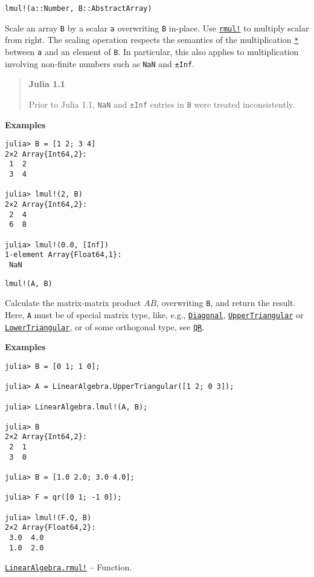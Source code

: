 \begin{adjustwidth}{2em}{0pt}


\begin{verbatim}
lmul!(a::Number, B::AbstractArray)
\end{verbatim}

Scale an array \texttt{B} by a scalar \texttt{a} overwriting \texttt{B} in-place.  Use \hyperlink{11562785155463579477}{\texttt{rmul!}} to multiply scalar from right.  The scaling operation respects the semantics of the multiplication \hyperlink{7592762607639177347}{\texttt{*}} between \texttt{a} and an element of \texttt{B}.  In particular, this also applies to multiplication involving non-finite numbers such as \texttt{NaN} and \texttt{±Inf}.

\begin{quote}
\textbf{Julia 1.1}

Prior to Julia 1.1, \texttt{NaN} and \texttt{±Inf} entries in \texttt{B} were treated inconsistently.

\end{quote}
\textbf{Examples}


\begin{verbatim}
julia> B = [1 2; 3 4]
2×2 Array{Int64,2}:
 1  2
 3  4

julia> lmul!(2, B)
2×2 Array{Int64,2}:
 2  4
 6  8

julia> lmul!(0.0, [Inf])
1-element Array{Float64,1}:
 NaN
\end{verbatim}




\begin{lstlisting}
lmul!(A, B)
\end{lstlisting}

Calculate the matrix-matrix product \(AB\), overwriting \texttt{B}, and return the result. Here, \texttt{A} must be of special matrix type, like, e.g., \hyperlink{3300114559258360989}{\texttt{Diagonal}}, \hyperlink{6344726545165008167}{\texttt{UpperTriangular}} or \hyperlink{15116078732779234709}{\texttt{LowerTriangular}}, or of some orthogonal type, see \hyperlink{16913872014958777367}{\texttt{QR}}.

\textbf{Examples}


\begin{verbatim}
julia> B = [0 1; 1 0];

julia> A = LinearAlgebra.UpperTriangular([1 2; 0 3]);

julia> LinearAlgebra.lmul!(A, B);

julia> B
2×2 Array{Int64,2}:
 2  1
 3  0

julia> B = [1.0 2.0; 3.0 4.0];

julia> F = qr([0 1; -1 0]);

julia> lmul!(F.Q, B)
2×2 Array{Float64,2}:
 3.0  4.0
 1.0  2.0
\end{verbatim}



\end{adjustwidth}
\hypertarget{11562785155463579477}{} 
\hyperlink{11562785155463579477}{\texttt{LinearAlgebra.rmul!}}  -- {Function.}

